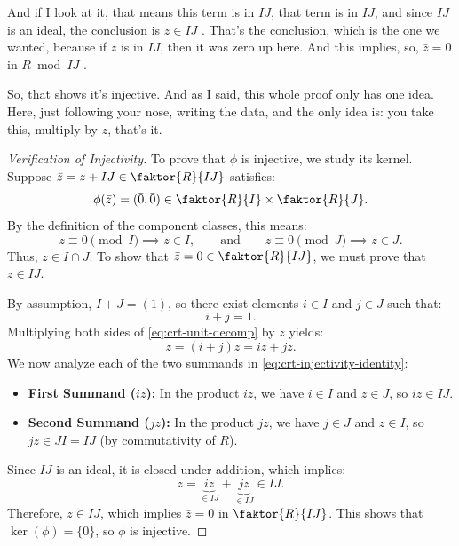 \begin{proofWrapper}
\begin{speech}[00:07:50 - 00:09:25]
And if I look at it, that means this term is in $IJ$, that term is in $IJ$, and since $IJ$ is an ideal, the conclusion is $z \in IJ$ . That's the conclusion, which is the one we wanted, because if $z$ is in $IJ$, then it was zero up here. And this implies, so, $\bar{z} = 0$ in $R \bmod IJ$ .

So, that shows it's injective. And as I said, this whole proof only has one idea. Here, just following your nose, writing the data, and the only idea is: you take this, multiply by $z$, that's it.
\end{speech}

\begin{content}
\begin{proof}[Verification of Injectivity]
To prove that $\phi$ is injective, we study its kernel. Suppose $\bar{z} = z + IJ \in \faktor{R}{IJ}$ satisfies:
\[
\phi(\bar{z}) = (\bar{0}, \bar{0}) \in \faktor{R}{I} \times \faktor{R}{J}.
\]
By the definition of the component classes, this means:
\[
z \equiv 0 \pmod I \implies z \in I, \qquad \text{and} \qquad z \equiv 0 \pmod J \implies z \in J.
\]
Thus, $z \in I \cap J$. To show that $\bar{z} = 0 \in \faktor{R}{IJ}$, we must prove that $z \in IJ$.

\par\vspace{1ex}\noindent
By assumption, $I + J = (1)$, so there exist elements $i \in I$ and $j \in J$ such that:
\begin{equation}\label{eq:crt-unit-decomp}
i + j = 1.
\end{equation}
Multiplying both sides of \eqref{eq:crt-unit-decomp} by $z$ yields:
\begin{equation}\label{eq:crt-injectivity-identity}
z = (i + j)z = iz + jz.
\end{equation}
We now analyze each of the two summands in \eqref{eq:crt-injectivity-identity}:
\begin{itemize}
    \item \textbf{First Summand ($iz$):} In the product $iz$, we have $i \in I$ and $z \in J$, so $iz \in IJ$.
    \item \textbf{Second Summand ($jz$):} In the product $jz$, we have $j \in J$ and $z \in I$, so $jz \in JI = IJ$ (by commutativity of $R$).
\end{itemize}
Since $IJ$ is an ideal, it is closed under addition, which implies:
\[
z = \underbrace{iz}_{\in IJ} + \underbrace{jz}_{\in IJ} \in IJ.
\]
Therefore, $z \in IJ$, which implies $\bar{z} = 0$ in $\faktor{R}{IJ}$. This shows that $\ker(\phi) = \{0\}$, so $\phi$ is injective.
\end{proof}
\end{content}


\end{proofWrapper}
